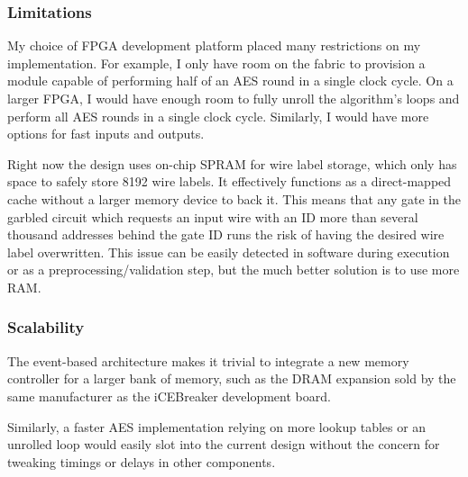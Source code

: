 \subsubsection{Limitations}
My choice of FPGA development platform placed many restrictions on my implementation. For example, I only have room on the fabric to provision a module capable of performing half of an AES round in a single clock cycle. On a larger FPGA, I would have enough room to fully unroll the algorithm's loops and perform all AES rounds in a single clock cycle. Similarly, I would have more options for fast inputs and outputs.

Right now the design uses on-chip SPRAM for wire label storage, which only has space to safely store 8192 wire labels. It effectively functions as a direct-mapped cache without a larger memory device to back it. This means that any gate in the garbled circuit which requests an input wire with an ID more than several thousand addresses behind the gate ID runs the risk of having the desired wire label overwritten. This issue can be easily detected in software during execution or as a preprocessing/validation step, but the much better solution is to use more RAM.

\subsubsection{Scalability}
The event-based architecture makes it trivial to integrate a new memory controller for a larger bank of memory, such as the DRAM expansion sold by the same manufacturer as the iCEBreaker development board.

Similarly, a faster AES implementation relying on more lookup tables or an unrolled loop would easily slot into the current design without the concern for tweaking timings or delays in other components.
